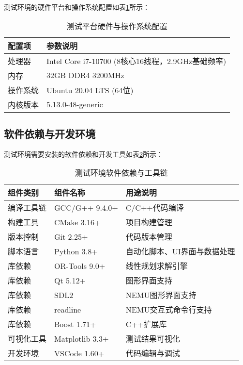 \documentclass[bachelor]{thesis-uestc}
\begin{document}
测试环境的硬件平台和操作系统配置如表\ref{tab:hw_platform}所示：

\begin{table}[htbp]
\caption{测试平台硬件与操作系统配置}
\centering
\begin{tabular}{|l|l|}
\hline
\textbf{配置项} & \textbf{参数说明} \\
\hline
处理器 & Intel Core i7-10700 (8核心16线程，2.9GHz基础频率) \\
\hline
内存 & 32GB DDR4 3200MHz \\
\hline
操作系统 & Ubuntu 20.04 LTS (64位) \\
\hline
内核版本 & 5.13.0-48-generic \\
\hline
\end{tabular}
\label{tab:hw_platform}
\end{table}

\subsection{软件依赖与开发环境}

测试环境需要安装的软件依赖和开发工具如表\ref{tab:software_dependencies}所示：

\begin{table}[htbp]
\caption{测试环境软件依赖与工具链}
\centering
\begin{tabular}{|l|l|p{8cm}|}
\hline
\textbf{组件类别} & \textbf{组件名称} & \textbf{用途说明} \\
\hline
编译工具链 & GCC/G++ 9.4.0+ & C/C++代码编译 \\
\hline
构建工具 & CMake 3.16+ & 项目构建管理 \\
\hline
版本控制 & Git 2.25+ & 代码版本管理 \\
\hline
脚本语言 & Python 3.8+ & 自动化脚本、UI界面与数据处理 \\
\hline
库依赖 & OR-Tools 9.0+ & 线性规划求解引擎 \\
\hline
库依赖 & Qt 5.12+ & 图形界面支持 \\
\hline
库依赖 & SDL2 & NEMU图形界面支持 \\
\hline
库依赖 & readline & NEMU交互式命令行支持 \\
\hline
库依赖 & Boost 1.71+ & C++扩展库 \\
\hline
可视化工具 & Matplotlib 3.3+ & 测试结果可视化 \\
\hline
开发环境 & VSCode 1.60+ & 代码编辑与调试 \\
\hline
\end{tabular}
\label{tab:software_dependencies}
\end{table}
\end{document}
